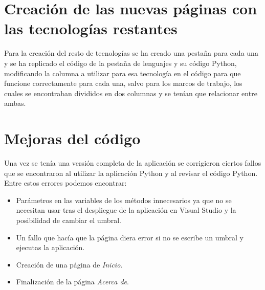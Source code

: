 \section{Creación de las nuevas páginas con las tecnologías restantes}
Para la creación del resto de tecnologías se ha creado una pestaña para cada una y se ha replicado el código de la pestaña de lenguajes y su código Python, modificando la columna a utilizar para esa tecnología en el código para que funcione correctamente para cada una, salvo para los marcos de trabajo, los cuales se encontraban divididos en dos columnas y se tenían que relacionar entre ambas.

\section{Mejoras del código}
Una vez se tenía una versión completa de la aplicación se corrigieron ciertos fallos que se encontraron al utilizar la aplicación Python y al revisar el código Python. Entre estos errores podemos encontrar:
\begin{itemize}
    \item Parámetros en las variables de los métodos innecesarios ya que no se necesitan usar tras el despliegue de la aplicación en Visual Studio y la posibilidad de cambiar el umbral.
    \item Un fallo que hacía que la página diera error si no se escribe un umbral y ejecutas la aplicación.
    \item Creación de una página de \textit{Inicio}.
    \item Finalización de la página \textit{Acerca de}.
\end{itemize}
 
